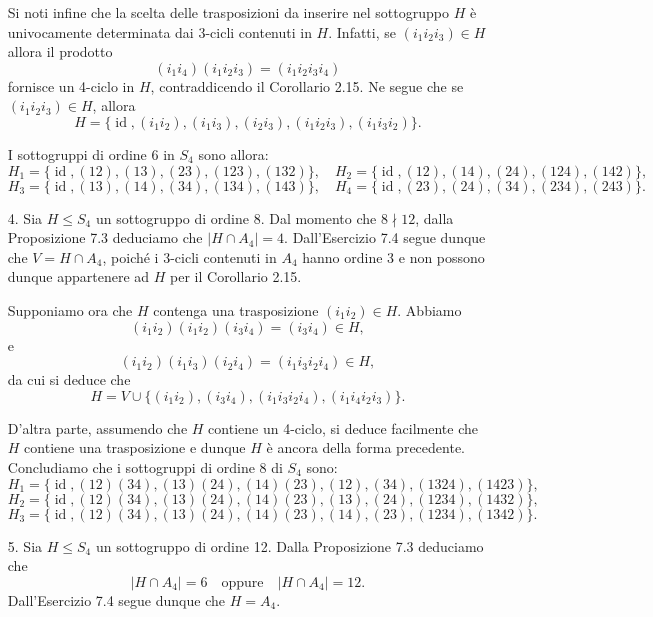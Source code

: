 \documentclass[12px]{article}
\begin{document}
\begin{enumerate}
Si noti infine che la scelta delle trasposizioni da inserire nel sottogruppo $H$ è univocamente determinata dai 3-cicli contenuti in $H$. Infatti, se $(i_1 i_2 i_3) \in H$ allora il prodotto 
\[
	(i_1i_4)(i_1 i_2 i_3) = (i_1 i_2 i_3 i_4)
\]
fornisce un 4-ciclo in $H$, contraddicendo il Corollario 2.15. Ne segue che se $(i_1 i_2 i_3) \in H$, allora
\[
H = \{\operatorname{id}, (i_1 i_2), (i_1 i_3), (i_2 i_3), (i_1 i_2 i_3), (i_1 i_3 i_2)\}.
\]

I sottogruppi di ordine 6 in $S_4$ sono allora:
\[
H_1 = \{\operatorname{id}, (12), (13), (23), (123), (132)\}, \quad
H_2 = \{\operatorname{id}, (12), (14), (24), (124), (142)\},
\]
\[
H_3 = \{\operatorname{id}, (13), (14), (34), (134), (143)\}, \quad
H_4 = \{\operatorname{id}, (23), (24), (34), (234), (243)\}.
\]

    \item[4.] Sia $H \leq S_4$ un sottogruppo di ordine 8. Dal momento che $8 \nmid 12$, dalla Proposizione 7.3 deduciamo che $\lvert H \cap A_4 \rvert = 4$. Dall’Esercizio 7.4 segue dunque che $V = H \cap A_4$, poiché i 3-cicli contenuti in $A_4$ hanno ordine 3 e non possono dunque appartenere ad $H$ per il Corollario 2.15.

    Supponiamo ora che $H$ contenga una trasposizione $(i_1 i_2) \in H$. Abbiamo
    \[
    (i_1 i_2)(i_1 i_2)(i_3 i_4) = (i_3 i_4) \in H,
    \]
    e
    \[
    (i_1 i_2)(i_1 i_3)(i_2 i_4) = (i_1i_3i_2i_4) \in H,
    \]
    da cui si deduce che 
    \[
    H = V \cup \{(i_1 i_2), (i_3 i_4), (i_1 i_3 i_2 i_4), (i_1 i_4 i_2 i_3)\}.
    \]

    D’altra parte, assumendo che $H$ contiene un 4-ciclo, si deduce facilmente che $H$ contiene una trasposizione e dunque $H$ è ancora della forma precedente. Concludiamo che i sottogruppi di ordine 8 di $S_4$ sono:
    \[
    H_1 = \{\operatorname{id}, (12)(34), (13)(24), (14)(23), (12), (34), (1324), (1423)\},
    \]
    \[
    H_2 = \{\operatorname{id}, (12)(34), (13)(24), (14)(23), (13), (24), (1234), (1432)\},
    \]
    \[
    H_3 = \{\operatorname{id}, (12)(34), (13)(24), (14)(23), (14), (23), (1234), (1342)\}.
    \]

    \item[5.] Sia $H \leq S_4$ un sottogruppo di ordine 12. Dalla Proposizione 7.3 deduciamo che 
    \[
    \lvert H \cap A_4 \rvert = 6 \quad \text{oppure} \quad \lvert H \cap A_4 \rvert = 12.
    \]
    Dall’Esercizio 7.4 segue dunque che $H = A_4$.
\end{enumerate}


		 \newpage
\end{document}
